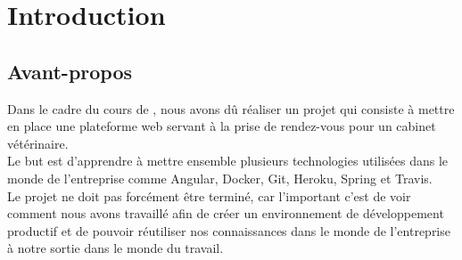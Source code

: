 \section{Introduction}
\subsection*{Avant-propos}
Dans le cadre du cours de \textit{\cours}, nous avons dû réaliser un projet qui consiste à mettre en place une plateforme web servant à la prise de rendez-vous pour un cabinet vétérinaire. \\
Le but est d'apprendre à mettre ensemble plusieurs technologies utilisées dans le monde de l'entreprise comme Angular, Docker, Git, Heroku, Spring et Travis. \\
Le projet ne doit pas forcément être terminé, car l'important c'est de voir comment nous avons travaillé afin de créer un environnement de développement productif et de pouvoir réutiliser nos connaissances dans le monde de l'entreprise à notre sortie dans le monde du travail.